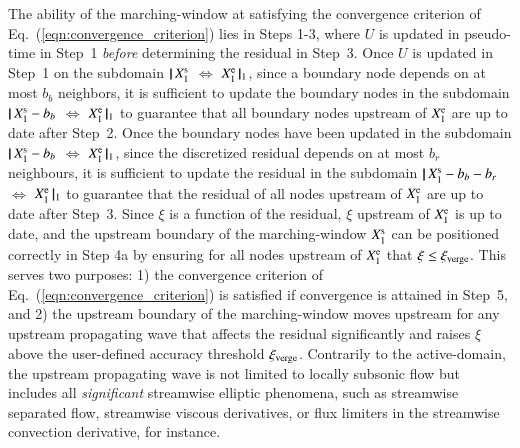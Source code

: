 \documentclass{warpdoc}
\newcommand{\bb}{{b_b}}
\newcommand{\br}{{b_r}}
\newcommand{\loope}{{\rm e}}
\newcommand{\loops}{{\rm s}}
\newcommand{\xiverge}{{\xi_{\rm verge}}}
\newcommand\subdomain[3]{$ | \! | \, #2 $ $\Leftrightarrow$ $#3 \, | \! |_{#1}$}
\begin{document}
The ability of the marching-window at satisfying the convergence criterion of
Eq.~(\ref{eqn:convergence_criterion}) lies in Steps 1-3, where $U$ is updated in
pseudo-time in Step~1 \emph{before} determining the residual in Step~3. Once $U$
is updated in Step~1 on the subdomain \subdomain{1}{X^{\loops}_1}{X^{\loope}_1}, since
a boundary node depends on at most $\bb$ neighbors, it is sufficient to update
the boundary nodes in the subdomain \subdomain{1}{X^{\loops}_1-\bb}{X^{\loope}_1}
to guarantee that all boundary nodes upstream of $X^{\loope}_1$ are up to date
after Step~2.
Once the boundary nodes have been updated in the subdomain
\subdomain{1}{X^{\loops}_1-\bb}{X^{\loope}_1}, since the discretized residual depends
on at most $\br$ neighbours, it is sufficient to update the residual in the
subdomain \subdomain{1}{X^{\loops}_1-\bb-\br}{X^{\loope}_1} to guarantee that the
residual of all nodes upstream of $X^{\loope}_1$ are up to date after Step~3.
Since $\xi$ is a function of the residual, $\xi$ upstream of $X^{\loope}_1$
is up to date, and the upstream boundary of the marching-window $X^{\loops}_1$
can be positioned correctly in Step 4a by ensuring for all nodes upstream
of $X^{\loope}_1$ that $\xi\leq\xiverge$. This serves two purposes: 1) the convergence
criterion of Eq.~(\ref{eqn:convergence_criterion}) is satisfied if convergence
is attained in Step~5, and 2) the upstream boundary of the marching-window
moves upstream for any upstream propagating wave that affects the residual significantly
and raises $\xi$ above the user-defined accuracy threshold $\xiverge$. Contrarily
to the active-domain, the upstream propagating wave is not limited to locally
subsonic flow but includes all \emph{significant} streamwise elliptic phenomena,
such as streamwise separated flow, streamwise viscous derivatives, or flux limiters
in the streamwise convection derivative, for instance.
\end{document}
